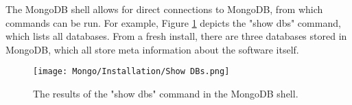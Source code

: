 
\noindent The MongoDB shell allows for direct connections to MongoDB, from which commands can be run. For example, Figure \ref{fig:ShowDBs} 
depicts the "show dbs" command, which lists all databases. From a fresh install, there are three databases stored in MongoDB,
which all store meta information about the software itself.

\begin{figure}[H]
    \centering
    \texttt{[image: Mongo/Installation/Show DBs.png]}
    \caption{The results of the "show dbs" command in the MongoDB shell.\label{fig:ShowDBs}}
\end{figure}



\endgroup
